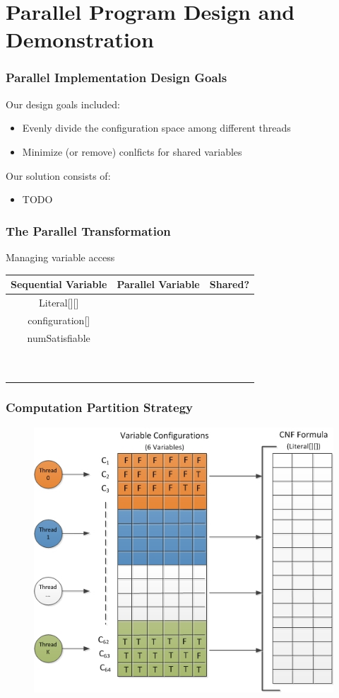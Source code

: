 \documentclass[handout]{beamer}
\begin{document}
\section{Parallel Program Design and Demonstration}
\begin{frame}
	\frametitle{Parallel Implementation Design Goals}
	Our design goals included:
	\begin{itemize}
		\item Evenly divide the configuration space among different threads
		\item Minimize (or remove) conlficts for shared variables
	\end{itemize}

	\medskip

	Our solution consists of:
	\begin{itemize}
		\item TODO
	\end{itemize}
\end{frame}

\begin{frame}
	\frametitle{The Parallel Transformation}
	Managing variable access
\begin{table}
	\begin{tabular}{c | c | c}
	Sequential Variable & Parallel Variable & Shared? \\ \hline
	Literal[][] & ~ & ~ \\
	configuration[] & ~ & ~ \\
	numSatisfiable & ~ & ~ \\
	~ & ~ & ~ \\
	~ & ~ & ~ \\
	\end{tabular}
\end{table}
\end{frame}

\begin{frame}
	\frametitle{Computation Partition Strategy}
\begin{figure}
\centering
\includegraphics[scale = 0.45]{teamdesign.jpg}
\end{figure}
\end{frame}
\end{document}
